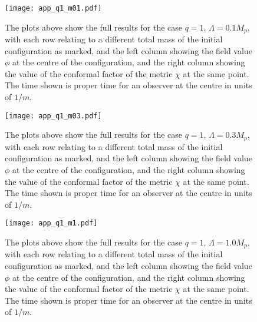 \documentclass[11pt,a4paper]{article}
\begin{document}
\begin{figure}[h!]\centering
\texttt{[image: app\_q1\_m01.pdf]}
\caption{The plots above show the full results for the case $q=1$, $\Lambda=0.1 M_p$, with each row relating to a different total mass of the initial configuration as marked, and the left column showing the field value $\phi$ at the centre of the configuration, and the right column showing the value of the conformal factor of the metric $\chi$ at the same point.  The time shown is proper time for an observer at the centre in units of $1/m$.}
\end{figure}
\pagebreak
\begin{figure}[h!]\centering
\texttt{[image: app\_q1\_m03.pdf]}
\caption{The plots above show the full results for the case $q=1$, $\Lambda=0.3 M_p$, with each row relating to a different total mass of the initial configuration as marked, and the left column showing the field value $\phi$ at the centre of the configuration, and the right column showing the value of the conformal factor of the metric $\chi$ at the same point.  The time shown is proper time for an observer at the centre in units of $1/m$.}
\end{figure}
\pagebreak
\begin{figure}[h!]\centering
\texttt{[image: app\_q1\_m1.pdf]}
\caption{The plots above show the full results for the case $q=1$, $\Lambda=1.0 M_p$, with each row relating to a different total mass of the initial configuration as marked, and the left column showing the field value $\phi$ at the centre of the configuration, and the right column showing the value of the conformal factor of the metric $\chi$ at the same point.  The time shown is proper time for an observer at the centre in units of $1/m$.}
\end{figure}

\medskip

%



\end{document}
